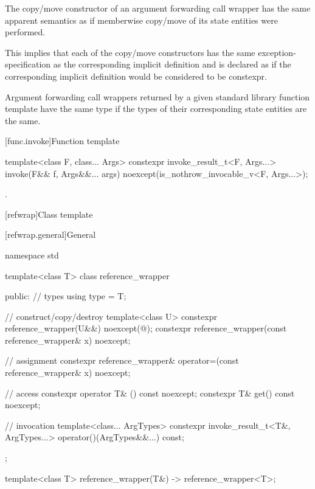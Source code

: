 \pnum
The copy/move constructor of an argument forwarding call wrapper has
the same apparent semantics
as if memberwise copy/move of its state entities
were performed.
\begin{note}
This implies that each of the copy/move constructors has
the same exception-specification as
the corresponding implicit definition and is declared as 
if the corresponding implicit definition would be considered to be constexpr.
\end{note}

\pnum
Argument forwarding call wrappers returned by
a given standard library function template have the same type
if the types of their corresponding state entities are the same.

[func.invoke]{Function template }
%
%
\begin{itemdecl}
template<class F, class... Args>
  constexpr invoke_result_t<F, Args...> invoke(F&& f, Args&&... args)
    noexcept(is_nothrow_invocable_v<F, Args...>);
\end{itemdecl}

\begin{itemdescr}
\pnum
\returns
{}.
\end{itemdescr}

[refwrap]{Class template }

[refwrap.general]{General}

%
%
\begin{codeblock}
namespace std {
  template<class T> class reference_wrapper {
  public:
    // types
    using type = T;

    // construct/copy/destroy
    template<class U>
      constexpr reference_wrapper(U&&) noexcept(@\seebelow@);
    constexpr reference_wrapper(const reference_wrapper& x) noexcept;

    // assignment
    constexpr reference_wrapper& operator=(const reference_wrapper& x) noexcept;

    // access
    constexpr operator T& () const noexcept;
    constexpr T& get() const noexcept;

    // invocation
    template<class... ArgTypes>
      constexpr invoke_result_t<T&, ArgTypes...> operator()(ArgTypes&&...) const;
  };

  template<class T>
    reference_wrapper(T&) -> reference_wrapper<T>;
}
\end{codeblock}

